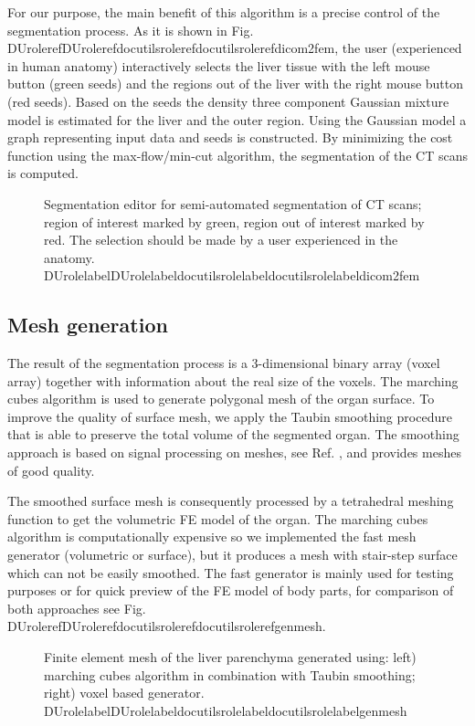 \documentclass[letterpaper,compsoc,twoside]{IEEEtran}
\providecommand*{\DUrole}[2]{\ifcsname DUrole#1\endcsname \csname DUrole#1\endcsname{#2}\else \ifcsname docutilsrole#1\endcsname \csname docutilsrole#1\endcsname{#2}\else #2\fi \fi }
\begin{document}
For our purpose, the main benefit of this algorithm is a precise
control of the segmentation process. As it is shown in
Fig. \DUrole{ref}{dicom2fem}, the user (experienced in human anatomy) interactively
selects the liver tissue with the left mouse button (green seeds) and
the regions out of the liver with the right mouse button (red
seeds). Based on the seeds the density three component Gaussian
mixture model is estimated for the liver and the outer region. Using
the Gaussian model a graph representing input data and seeds is
constructed. By minimizing the cost function using the
max-flow/min-cut algorithm, the segmentation of the CT scans is
computed.\begin{figure}[]\noindent{}
\caption{Segmentation editor for semi-automated segmentation of CT scans;
region of interest marked by green, region out of interest marked
by red. The selection should be made by a user experienced in the
anatomy. \DUrole{label}{dicom2fem}}
\end{figure}

\subsection{Mesh generation\label{mesh-generation}}


The result of the segmentation process is a 3-dimensional binary array
(voxel array) together with information about the real size of the
voxels. The marching cubes algorithm \cite{Lor87} is used to generate
polygonal mesh of the organ surface. To improve the quality of surface
mesh, we apply the Taubin smoothing procedure \cite{Tau95} that is able to
preserve the total volume of the segmented organ. The smoothing
approach is based on signal processing on meshes, see Ref. \cite{Tau00},
and provides meshes of good quality.

The smoothed surface mesh is consequently processed by a tetrahedral
meshing function to get the volumetric FE model of the organ. The
marching cubes algorithm is computationally expensive so we implemented
the fast mesh generator (volumetric or surface), but it produces a
mesh with stair-step surface which can not be easily smoothed. The
fast generator is mainly used for testing purposes or for quick
preview of the FE model of body parts, for comparison of both
approaches see Fig. \DUrole{ref}{genmesh}.\begin{figure}[]\noindent{}
\caption{Finite element mesh of the liver parenchyma generated using: left)
marching cubes algorithm in combination with Taubin smoothing;
right) \textquotedbl{}voxel based\textquotedbl{} generator. \DUrole{label}{genmesh}}
\end{figure}
\end{document}
